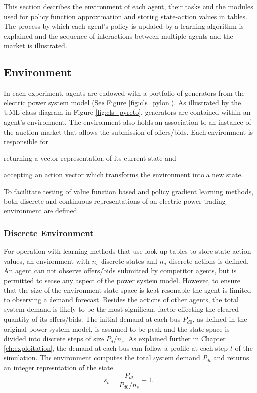 This section describes the environment of each agent, their tasks and the
modules used for policy function approximation and storing state-action values
in tables. The process by which each agent's policy is updated by a learning
algorithm is explained and the sequence of interactions between multiple
agents and the market is illustrated.

\subsection{Environment}
In each experiment, agents are endowed with a portfolio of generators from the
electric power system model (See Figure \ref{fig:cls_pylon}).  As
illustrated by the UML class diagram in Figure \ref{fig:cls_pyreto},
generators are contained within an agent's environment.  The environment also
holds an association to an instance of the auction market that allows the
submission of offers/bids. Each environment is responsible for \begin{inparaenum}[(i)]
\item returning a vector representation of its current state and \item
accepting an action vector which transforms the environment into a new state.
\end{inparaenum}  To facilitate testing of value function based and policy
gradient learning methods, both discrete and continuous representations of an
electric power trading environment are defined.



\subsubsection{Discrete Environment}
For operation with learning methods that use look-up tables to store
state-action values, an environment with $n_s$ discrete states and $n_a$
discrete actions is defined.  An agent can not observe offers/bids submitted by competitor agents, but is permitted to sense any aspect of the power system
model.  However, to ensure that the size of the environment state space is kept
resonable the agent is limited to observing a demand forecast.  Besides the
actions of other agents, the total system demand is likely to be the most
significant factor effecting the cleared quantity of its offers/bids.  The
initial demand at each bus $P_{d0}$, as defined in the original power system
model, is assumed to be peak and the state space is divided into discrete steps
of size $P_d / n_s$.  As explained further in Chapter \ref{ch:exploitation},
the demand at each bus can follow a profile at each step $t$ of the
simulation.  The environment computes the total system demand $P_{d t}$ and
returns an integer represntation of the state
\begin{equation}
s_t = \frac{P_{d t}}{P_{d0} / n_s} + 1.
\end{equation}

